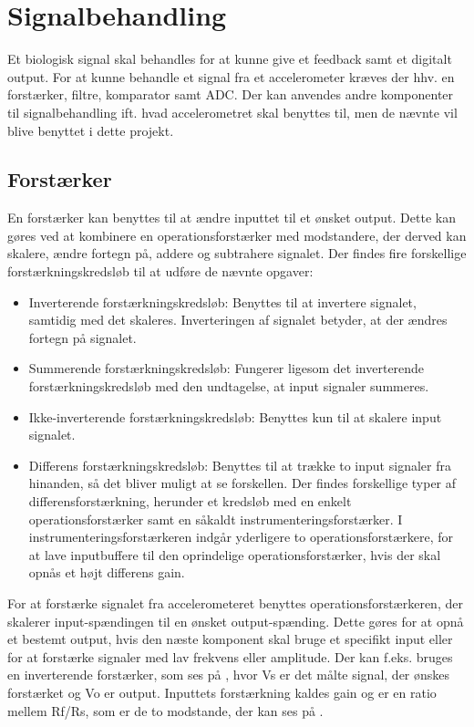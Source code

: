\section{Signalbehandling}
Et biologisk signal skal behandles for at kunne give et feedback samt et digitalt output. For at kunne behandle et signal fra et accelerometer kræves der hhv. en forstærker, filtre, komparator samt ADC. Der kan anvendes andre komponenter til signalbehandling ift. hvad accelerometret skal benyttes til, men de nævnte vil blive benyttet i dette projekt. 

\subsection{Forstærker}
En forstærker kan benyttes til at ændre inputtet til et ønsket output. Dette kan gøres ved at kombinere en operationsforstærker med modstandere, der derved kan skalere, ændre fortegn på, addere og subtrahere signalet. Der findes fire forskellige forstærkningskredsløb til at udføre de nævnte opgaver: \cite{Nilsson2011}
\begin{itemize}
\item Inverterende forstærkningskredsløb: Benyttes til at invertere signalet, samtidig med det skaleres. Inverteringen af signalet betyder, at der ændres fortegn på signalet.
\item Summerende forstærkningskredsløb: Fungerer ligesom det inverterende forstærkningskredsløb med den undtagelse, at input signaler summeres.
\item Ikke-inverterende forstærkningskredsløb: Benyttes kun til at skalere input signalet.
\item Differens forstærkningskredsløb: Benyttes til at trække to input signaler fra hinanden, så det bliver muligt at se forskellen\cite{Nilsson2011}. Der findes forskellige typer af differensforstærkning, herunder et kredsløb med en enkelt operationsforstærker samt en såkaldt instrumenteringsforstærker. I instrumenteringsforstærkeren indgår yderligere to operationsforstærkere, for at lave inputbuffere til den oprindelige operationsforstærker, hvis der skal opnås et højt differens gain.  
\end{itemize} 

For at forstærke signalet fra accelerometeret benyttes operationsforstærkeren, der skalerer input-spændingen til en ønsket output-spænding. Dette gøres for at opnå et bestemt output, hvis den næste komponent skal bruge et specifikt input eller for at forstærke signaler med lav frekvens eller amplitude. Der kan f.eks. bruges en inverterende forstærker, som ses på , hvor Vs er det målte signal, der ønskes forstærket og Vo er output. Inputtets forstærkning kaldes gain og er en ratio mellem Rf/Rs, som er de to modstande, der kan ses på . \cite{Nilsson2011}

